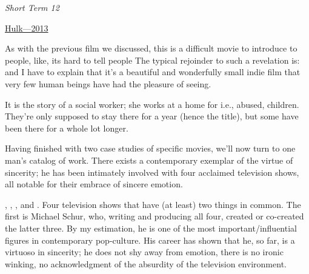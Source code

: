 \documentclass[../butidigress.tex]{subfiles}
\begin{document}

\begin{somenotes}{\textit{Short Term 12}}
    \item \href{https://birthmoviesdeath.com/2013/03/16/sxsw-review-why-short-term-12-is-a-masterpiece}{Hulk---2013}\autocite{hulkshortterm2015}
\end{somenotes}

As with the previous film we discussed, this is a difficult movie to introduce to people, like, its hard to tell people 
The typical rejoinder to such a revelation is:  and I have to explain that it's a beautiful and wonderfully small indie film that very few human beings have had the pleasure of seeing.

It is the story of a social worker; she works at a home for  i.e., abused, children.
They're only supposed to stay there for a year (hence the title), but some have been there for a whole lot longer.

\entryskip

Having finished with two case studies of specific movies, we'll now turn to one man's catalog of work.
There exists a contemporary exemplar of the virtue of sincerity; he has been intimately involved with four acclaimed television shows, all notable for their embrace of sincere emotion.

, , , and .
Four television shows that have (at least) two things in common.
The first is Michael Schur, who, writing and producing all four, created or co-created the latter three.
By my estimation, he is one of the most important/influential figures in contemporary pop-culture.
His career has shown that he, so far, is a virtuoso in sincerity; he does not shy away from emotion, there is no ironic winking, no acknowledgment of the absurdity of the television environment.
\end{document}
